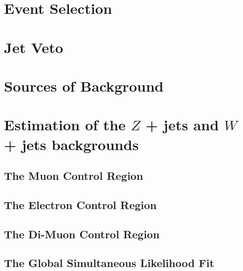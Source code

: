 \documentclass[10pt,twoside,cucitura,classica,english,openany]{toptesi}
\begin{document}


\section{Event Selection}
\label{sec:event-selection}



\section{Jet Veto }
\label{sec:jet-veto}



\section{Sources of Background}
\label{sec:sources-background}



\section{Estimation of the $Z$ + jets and $W$ + jets backgrounds}
\label{sec:estimation-z-+}



\subsection{The Muon Control Region}
\label{sec:muon-control-region}



\subsection{The Electron Control Region}
\label{sec:electr-contr-regi}



\subsection{The Di-Muon Control Region}
\label{sec:di-muon-control}



\subsection{The Global Simultaneous Likelihood Fit}
\label{sec:glob-simult-likel}
\end{document}
